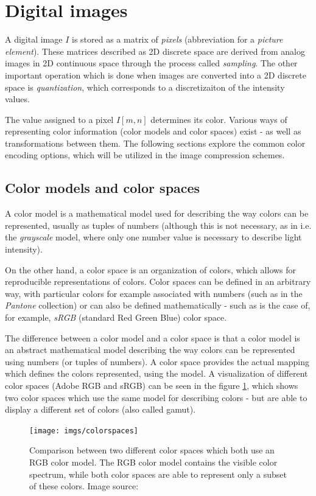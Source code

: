 \documentclass[thesis=M,english]{FITthesis}[2012/10/20]
\begin{document}
\section{Digital images}
A digital image $I$ is stored as a matrix of \emph{pixels} (abbreviation for a \emph{picture
element}). These matrices described as 2D discrete space are derived from analog
images in 2D continuous space through the process called \emph{sampling}. The other important
operation which is done when images are converted into a 2D discrete space is \emph{quantization},
which corresponds to a discretizaiton of the intensity values.

The value assigned to a pixel $I[m,n]$ determines its color. Various ways of representing
color information (color models and color spaces) exist - as well as transformations between
them. The following sections explore the common color encoding options, which will be
utilized in the image compression schemes.

\subsection{Color models and color spaces}
A color model is a mathematical model used for describing the way colors can be represented,
usually as tuples of numbers (although this is not necessary, as in i.e.
the \emph{grayscale} model, where only one number value is necessary to describe light intensity).

On the other hand, a color space is an organization of colors, which allows for reproducible
representations of colors. Color spaces can be defined in an arbitrary way, with particular
colors for example associated with numbers (such as in the \emph{Pantone} collection) or
can also be defined mathematically - such as is the case of, for example, \emph{sRGB} (standard
Red Green Blue) color space.

The difference between a color model and a color space is that a color model is an abstract
mathematical model describing the way colors can be represented using numbers (or tuples of numbers).
A color space provides the actual mapping which defines the colors represented, using the model.
A visualization of different color spaces (Adobe RGB and sRGB) can be seen in the figure \ref{fig:colorspaces},
which shows two color spaces which use the same model for describing colors - but are able to
display a different set of colors (also called gamut).

\begin{figure}[h]
  \centering
  \texttt{[image: imgs/colorspaces]}
  \caption[Comparison between two different color spaces using an RGB model]{Comparison
  		  between two different color spaces which both use an RGB color model. The
  		  RGB color model contains the visible color spectrum, while both color
  		  spaces are able to represent only a subset of these colors. Image source: \cite{wiki_colorspace}}
  \label{fig:colorspaces}
\end{figure}
\end{document}
